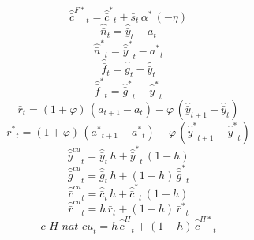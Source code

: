 \begin{dmath}
{{\hat {\bar c}^{F*}}}_{t}={{\hat {\bar c}^*}}_{t}+{{\bar s}}_{t}\, {{\alpha^*}}\, \left(-{{\eta}}\right)
\end{dmath}
\begin{dmath}
{{\hat {\bar n}}}_{t}={{\hat {\bar y}}}_{t}-{{a}}_{t}
\end{dmath}
\begin{dmath}
{{\hat {\bar n}^*}}_{t}={{\hat {\bar y}^*}}_{t}-{{a^*}}_{t}
\end{dmath}
\begin{dmath}
{{\hat {\bar f}}}_{t}={{\hat {\bar g}}}_{t}-{{\hat {\bar y}}}_{t}
\end{dmath}
\begin{dmath}
{{\hat {\bar f}^*}}_{t}={{\hat {\bar g}^*}}_{t}-{{\hat {\bar y}^*}}_{t}
\end{dmath}
\begin{dmath}
{{\bar r}}_{t}=\left(1+{{\varphi}}\right)\, \left({{a}}_{t+1}-{{a}}_{t}\right)-{{\varphi}}\, \left({{\hat {\bar y}}}_{t+1}-{{\hat {\bar y}}}_{t}\right)
\end{dmath}
\begin{dmath}
{{\bar r^*}}_{t}=\left(1+{{\varphi}}\right)\, \left({{a^*}}_{t+1}-{{a^*}}_{t}\right)-{{\varphi}}\, \left({{\hat {\bar y}^*}}_{t+1}-{{\hat {\bar y}^*}}_{t}\right)
\end{dmath}
\begin{dmath}
{{\hat {\bar y}^{cu}}}_{t}={{\hat {\bar y}}}_{t}\, {{h}}+{{\hat {\bar y}^*}}_{t}\, \left(1-{{h}}\right)
\end{dmath}
\begin{dmath}
{{\hat {\bar g}^{cu}}}_{t}={{\hat {\bar g}}}_{t}\, {{h}}+\left(1-{{h}}\right)\, {{\hat {\bar g}^*}}_{t}
\end{dmath}
\begin{dmath}
{{\hat {\bar c}^{cu}}}_{t}={{\hat {\bar c}}}_{t}\, {{h}}+{{\hat {\bar c}^*}}_{t}\, \left(1-{{h}}\right)
\end{dmath}
\begin{dmath}
{{\hat {\bar r}^{cu}}}_{t}={{h}}\, {{\bar r}}_{t}+\left(1-{{h}}\right)\, {{\bar r^*}}_{t}
\end{dmath}
\begin{dmath}
{c\_H\_nat\_cu}_{t}={{h}}\, {{\hat {\bar c}^H}}_{t}+\left(1-{{h}}\right)\, {{\hat {\bar c}^{H*}}}_{t}
\end{dmath}
